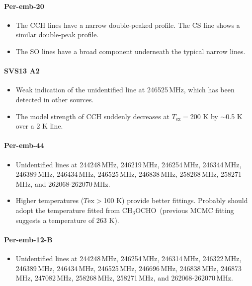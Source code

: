 \documentclass[twocolumn]{aastex62}
\newcommand{\mhz}{\mbox{\,MHz}}
\newcommand{\methylformate}{\mbox{CH$_{3}$OCHO}}
\begin{document}
\paragraph{Per-emb-20}
\begin{itemize}
  \item The CCH lines have a narrow double-peaked profile.  The CS line shows a similar double-peak profile.
  \item The SO lines have a broad component underneath the typical narrow lines.
\end{itemize}

\paragraph{SVS13 A2}
\begin{itemize}
  \item Weak indication of the unidentified line at 246525\mhz, which has been detected in other sources.
  \item The model strength of CCH suddenly decreases at $T_\text{ex} = $200 K by $\sim$0.5 K over a 2 K line.
\end{itemize}

\paragraph{Per-emb-44}
\begin{itemize}
  \item Unidentified lines at 244248\mhz, 246219\mhz, 246254\mhz, 246344\mhz, 246389\mhz, 246434\mhz, 246525\mhz, 246838\mhz, 258268\mhz, 258271\mhz, and 262068-262070\mhz.
  \item Higher temperatures ($T\text{ex} > $100 K) provide better fittings.  Probably should adopt the temperature fitted from \methylformate\ (previous MCMC fitting suggests a temperature of 263 K).
\end{itemize}

\paragraph{Per-emb-12-B}
\begin{itemize}
  \item Unidentified lines at 244248\mhz, 246254\mhz, 246314\mhz, 246322\mhz, 246389\mhz, 246434\mhz, 246525\mhz, 246696\mhz, 246838\mhz, 246873\mhz, 247082\mhz, 258268\mhz, 258271\mhz, and 262068-262070\mhz.
\end{itemize}
\end{document}

